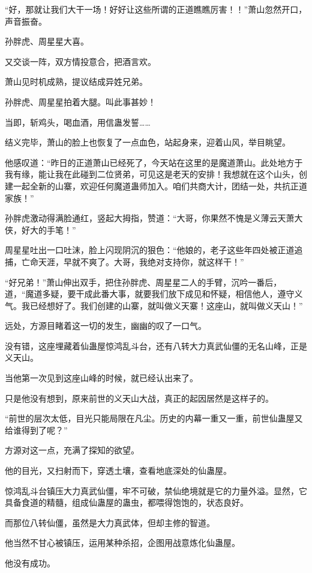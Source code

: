 \begin{this_body}
“好，那就让我们大干一场！好好让这些所谓的正道瞧瞧厉害！！”萧山忽然开口，声音振奋。

孙胖虎、周星星大喜。

又交谈一阵，双方情投意合，把酒言欢。

萧山见时机成熟，提议结成异姓兄弟。

孙胖虎、周星星拍着大腿。叫此事甚妙！

当即，斩鸡头，喝血酒，用信蛊发誓……

结义完毕，萧山的脸上也恢复了一点血色，站起身来，迎着山风，举目眺望。

他感叹道：“昨日的正道萧山已经死了，今天站在这里的是魔道萧山。此处地方于我有缘，能让我在此碰到二位贤弟，可见这是老天的安排！我想就在这个山头，创建一起全新的山寨，欢迎任何魔道蛊师加入。咱们共商大计，团结一处，共抗正道家族！”

孙胖虎激动得满脸通红，竖起大拇指，赞道：“大哥，你果然不愧是义薄云天萧大侠，好大的手笔！”

周星星吐出一口吐沫，脸上闪现阴沉的狠色：“他娘的，老子这些年四处被正道追捕，亡命天涯，早就不爽了。大哥，我绝对支持你，就这样干！”

“好兄弟！”萧山伸出双手，把住孙胖虎、周星星二人的手臂，沉吟一番后，道，“魔道多疑，要干成此番大事，就要我们放下成见和怀疑，相信他人，遵守义气。我已经想好了。我们创建的山寨，就叫做义天寨！这座山，就叫做义天山！”

远处，方源目睹着这一切的发生，幽幽的叹了一口气。

没有错，这座埋藏着仙蛊屋惊鸿乱斗台，还有八转大力真武仙僵的无名山峰，正是义天山。

当他第一次见到这座山峰的时候，就已经认出来了。

只是他没有想到，原来前世的义天山大战，真正的起因居然是这样子的。

“前世的层次太低，目光只能局限在凡尘。历史的内幕一重又一重，前世仙蛊屋又给谁得到了呢？”

方源对这一点，充满了探知的欲望。

他的目光，又扫射而下，穿透土壤，查看地底深处的仙蛊屋。

惊鸿乱斗台镇压大力真武仙僵，牢不可破，禁仙绝境就是它的力量外溢。显然，它具备食道的精髓，组成仙蛊屋的蛊虫，都喂得饱饱的，状态良好。

而那位八转仙僵，虽然是大力真武体，但却主修的智道。

他当然不甘心被镇压，运用某种杀招，企图用战意炼化仙蛊屋。

他没有成功。


\end{this_body}
